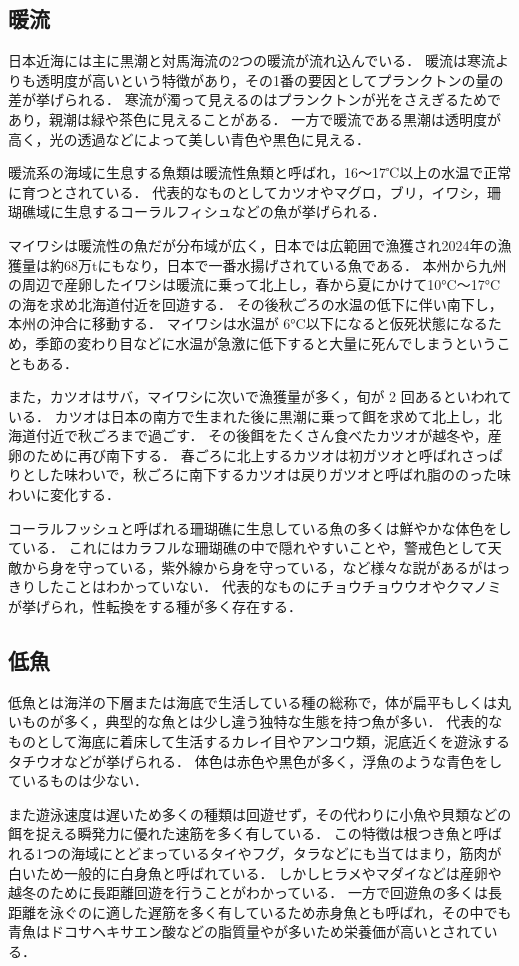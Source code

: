 \documentclass[12pt,a4j,titlepage]{ltjsarticle}
\begin{document}
\subsection{暖流}
日本近海には主に黒潮と対馬海流の2つの暖流が流れ込んでいる．
暖流は寒流よりも透明度が高いという特徴があり，その1番の要因としてプランクトンの量の差が挙げられる．
寒流が濁って見えるのはプランクトンが光をさえぎるためであり，親潮は緑や茶色に見えることがある．
一方で暖流である黒潮は透明度が高く，光の透過などによって美しい青色や黒色に見える．\par
暖流系の海域に生息する魚類は暖流性魚類と呼ばれ，16〜17℃以上の水温で正常に育つとされている．
代表的なものとしてカツオやマグロ，ブリ，イワシ，珊瑚礁域に生息するコーラルフィシュなどの魚が挙げられる．\par
マイワシは暖流性の魚だが分布域が広く，日本では広範囲で漁獲され2024年の漁獲量は約68万tにもなり，日本で一番水揚げされている魚である．
本州から九州の周辺で産卵したイワシは暖流に乗って北上し，春から夏にかけて10°C〜17°Cの海を求め北海道付近を回遊する．
その後秋ごろの水温の低下に伴い南下し，本州の沖合に移動する．
マイワシは水温が 6°C以下になると仮死状態になるため，季節の変わり目などに水温が急激に低下すると大量に死んでしまうということもある．\par
また，カツオはサバ，マイワシに次いで漁獲量が多く，旬が 2 回あるといわれている．
カツオは日本の南方で生まれた後に黒潮に乗って餌を求めて北上し，北海道付近で秋ごろまで過ごす．
その後餌をたくさん食べたカツオが越冬や，産卵のために再び南下する．
春ごろに北上するカツオは初ガツオと呼ばれさっぱりとした味わいで，秋ごろに南下するカツオは戻りガツオと呼ばれ脂ののった味わいに変化する．\par
コーラルフッシュと呼ばれる珊瑚礁に生息している魚の多くは鮮やかな体色をしている\cite{nettaigyo}．
これにはカラフルな珊瑚礁の中で隠れやすいことや，警戒色として天敵から身を守っている，紫外線から身を守っている，など様々な説があるがはっきりしたことはわかっていない．
代表的なものにチョウチョウウオやクマノミが挙げられ，性転換をする種が多く存在する．
\subsection{低魚}
低魚とは海洋の下層または海底で生活している種の総称で，体が扁平もしくは丸いものが多く，典型的な魚とは少し違う独特な生態を持つ魚が多い．
代表的なものとして海底に着床して生活するカレイ目やアンコウ類，泥底近くを遊泳するタチウオなどが挙げられる．
体色は赤色や黒色が多く，浮魚のような青色をしているものは少ない．\par
また遊泳速度は遅いため多くの種類は回遊せず，その代わりに小魚や貝類などの餌を捉える瞬発力に優れた速筋を多く有している．
この特徴は根つき魚と呼ばれる1つの海域にとどまっているタイやフグ，タラなどにも当てはまり，筋肉が白いため一般的に白身魚と呼ばれている\cite{iro}．
しかしヒラメやマダイなどは産卵や越冬のために長距離回遊を行うことがわかっている．
一方で回遊魚の多くは長距離を泳ぐのに適した遅筋を多く有しているため赤身魚とも呼ばれ，その中でも青魚はドコサヘキサエン酸などの脂質量やが多いため栄養価が高いとされている．
\end{document}
